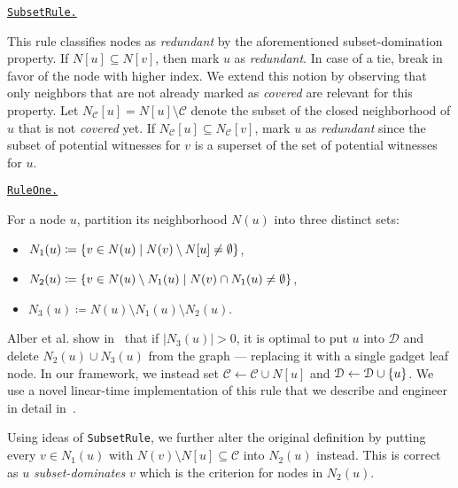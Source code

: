 \documentclass[a4paper, USenglish, cleveref, autoref, thm-restate, noalgorithm2e]{socg-lipics-v2021}
\newcommand{\setc}[2]{\ensuremath\left\{#1\;\middle|\;#2\right\}}
\newcommand{\set}[1]{\ensuremath\left\{#1\right\}}
\newcommand{\domset}{\ensuremath{\mathcal D}\xspace}
\newcommand{\cov}{\ensuremath{\mathcal C}\xspace}
\def\defrule#1{%
    \medskip
    
    \noindent
    \underline{\texttt{#1.}}
}
\begin{document}
\defrule{SubsetRule}
This rule classifies nodes as \emph{redundant} by the aforementioned subset-domination property.
If $N[u] \subseteq N[v]$, then mark $u$ as \emph{redundant}.
In case of a tie, break in favor of the node with higher index.
We extend this notion by observing that only neighbors that are not already marked as \emph{covered} are relevant for this property.
Let $N_\cov[u] = N[u] \setminus \cov$ denote the subset of the closed neighborhood of $u$ that is not \emph{covered} yet.
If $N_\cov[u] \subseteq N_\cov[v]$, mark $u$ as \emph{redundant} since the subset of potential witnesses for $v$ is a superset of the set of potential witnesses for $u$.

\defrule{RuleOne}
For a node $u$, partition its neighborhood $N(u)$ into three distinct sets:
\begin{itemize}
    \item $N_1(u) \coloneqq \setc{v \in N(u)}{N(v) \setminus N[u] \neq \emptyset}$,
    \item $N_2(u) \coloneqq \setc{v \in N(u) \setminus N_1(u)}{N(v) \cap N_1(u) \neq \emptyset}$,
    \item $N_3(u) \coloneqq N(u) \setminus N_1(u) \setminus N_2(u)$.
\end{itemize}
Alber et al. show in~\cite{DBLP:journals/jacm/AlberFN04} that if $|N_3(u)| > 0$, it is optimal to put $u$ into \domset and delete $N_2(u) \cup N_3(u)$ from the graph --- replacing it with a single gadget leaf node.
In our framework, we instead set $\cov \gets \cov \cup N[u]$ and $\domset \gets \domset \cup \set{u}$.
We use a novel linear-time implementation of this rule that we describe and engineer in detail in~\cite{SBFS}.

Using ideas of \texttt{SubsetRule}, we further alter the original definition by putting every $v \in N_1(u)$ with $N(v) \setminus N[u] \subseteq \cov$ into $N_2(u)$ instead.
This is correct as $u$ \emph{subset-dominates} $v$ which is the criterion for nodes in $N_2(u)$.
\end{document}
